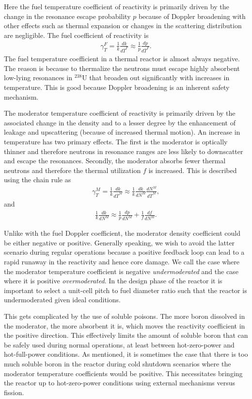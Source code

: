 Here the fuel temperature coefficient of reactivity is primarily driven by the change in the resonance escape probability $p$ because of Doppler broadening with other effects such as thermal expansion or changes in the scattering distribution are negligible. The fuel coefficient of reactivity is
\begin{align}
  \gamma_T^F = \frac{1}{k} \frac{dk}{d \overline{T}^F } \approx \frac{1}{p} \frac{dp}{d \overline{T}^F } .
\end{align}
The fuel temperature coefficient in a thermal reactor is almost always negative. The reason is because to thermalize the neutrons must escape highly absorbent low-lying resonances in $^{238}$U that broaden out significantly with increases in temperature. This is good because Doppler broadening is an inherent safety mechanism.

The moderator temperature coefficient of reactivity is primarily driven by the associated change in the density and to a lesser degree by the enhancement of leakage and upscattering (because of increased thermal motion). An increase in temperature has two primary effects. The first is the moderator is optically thinner and therefore neutrons in resonance ranges are less likely to downscatter and escape the resonances. Secondly, the moderator absorbs fewer thermal neutrons and therefore the thermal utilization $f$ is increased. This is described using the chain rule as
\begin{align}
  \gamma_T^M = \frac{1}{k} \frac{dk}{d \overline{T}^M }  \approx \frac{1}{k} \frac{dk}{dN^M} \frac{dN^M}{d \overline{T}^M } ,
\end{align}
and
\begin{align}
  \frac{1}{k} \frac{dk}{dN^M} \approx \frac{1}{p} \frac{dp}{d N^M } + \frac{1}{f} \frac{df}{d N^M } .
\end{align}

Unlike with the fuel Doppler coefficient, the moderator density coefficient could be either negative or positive. Generally speaking, we wish to avoid the latter scenario during regular operations because a positive feedback loop can lead to a rapid runaway in the reactivity and hence core damage. We call the case where the moderator temperature coefficient is negative \emph{undermoderated} and the case where it is positive \emph{overmoderated}. In the design phase of the reactor it is important to select a unit-cell pitch to fuel diameter ratio such that the reactor is undermoderated given ideal conditions. 

This gets complicated by the use of soluble poisons. The more boron dissolved in the moderator, the more absorbent it is, which moves the reactivity coefficient in the positive direction. This effectively limits the amount of soluble boron that can be safely used during normal operations, at least between hot-zero-power and hot-full-power conditions. As mentioned, it is sometimes the case that there is too much soluble boron in the reactor during cold shutdown scenarios where the moderator temperature coefficients would be positive. This necessitates bringing the reactor up to hot-zero-power conditions using external mechanisms versus fission.

